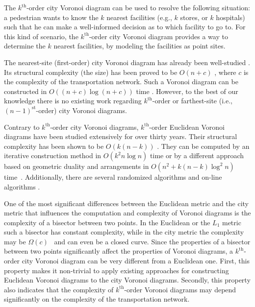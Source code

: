 \documentclass[11pt]{llncs}
\newcommand{\kth}{\ensuremath{k^{\mathrm{th}}}\xspace}
\newcommand{\kthorder}{\kth-order\xspace}
\begin{document}
The \kthorder city Voronoi diagram can be used to resolve the following situation:
a pedestrian wants to know the $k$ nearest facilities (e.g., $k$ stores, or $k$ hospitals)
such that he can make a well-informed decision as to which facility to go to.
For this kind of scenario,
the \kthorder city Voronoi diagram
provides a way to determine the $k$ nearest facilities, by modeling the facilities as point sites.





The nearest-site (first-order) city Voronoi diagram
has already been well-studied \cite{AAP-04,BC-05,BKC-09,GSW-08}.
Its structural complexity (the size)
has been proved to be $O(n+c)$ \cite{AAP-04},
where $c$ is the complexity of the transportation network.
Such a Voronoi diagram can be constructed in $O((n+c)\log(n+c))$ time \cite{BKC-09}.
However, to the best of our knowledge
there is no existing work regarding $k^{\mathrm{th}}$-order
or farthest-site (i.e., $(n-1)^\mathrm{st}$-order) city Voronoi diagrams.


Contrary to \kthorder city Voronoi diagrams,
\kthorder Euclidean Voronoi diagrams
have been studied extensively for over thirty years.
Their structural complexity has been shown to be $O(k(n-k))$ \cite{Lee-82}.
They can be computed by an iterative construction method in $O(k^2n\log n)$ time \cite{Lee-82}
or by a different approach based on geometric duality and arrangements in $O(n^2+k(n-k)\log^2 n)$ time~\cite{CE-87}.
Additionally, there are several randomized algorithms \cite{ABMS-98,Mulmuley-91}
and on-line algorithms \cite{AS-92,BDT-93}.



One of the most significant differences between the Euclidean metric and the city metric that influences the computation and complexity of Voronoi diagrams is the complexity of a bisector between two points.
In the Euclidean or the $L_1$ metric such a bisector has constant complexity, while in the city metric the complexity may be $\Omega(c)$~\cite{AAP-04} and can even be a closed curve.
Since the properties of a bisector between two points significantly affect the properties of Voronoi diagrams,
a \kthorder city Voronoi diagram can be very different from a Euclidean one.
First, this property makes it non-trivial to apply existing approaches for constructing Euclidean Voronoi diagrams to the city Voronoi diagrams.
Secondly, this property also indicates that the complexity of \kthorder Voronoi diagrams may depend significantly on the complexity of the transportation network.
\end{document}
